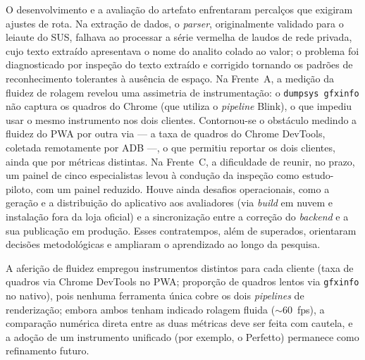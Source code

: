 O desenvolvimento e a avaliação do artefato enfrentaram percalços que exigiram
ajustes de rota. Na extração de dados, o \emph{parser}, originalmente validado para
o leiaute do SUS, falhava ao processar a série vermelha de laudos de rede privada,
cujo texto extraído apresentava o nome do analito colado ao valor; o problema foi
diagnosticado por inspeção do texto extraído e corrigido tornando os padrões de
reconhecimento tolerantes à ausência de espaço. Na Frente~A, a medição da fluidez
de rolagem revelou uma assimetria de instrumentação: o \texttt{dumpsys gfxinfo} não
captura os quadros do Chrome (que utiliza o \emph{pipeline} Blink), o que impediu
usar o mesmo instrumento nos dois clientes. Contornou-se o obstáculo medindo a
fluidez do PWA por outra via --- a taxa de quadros do Chrome DevTools, coletada
remotamente por ADB ---, o que permitiu reportar os dois clientes, ainda que por
métricas distintas. Na Frente~C, a dificuldade de
reunir, no prazo, um painel de cinco especialistas levou à condução da inspeção
como estudo-piloto, com um painel reduzido. Houve ainda desafios operacionais, como
a geração e a distribuição do aplicativo aos avaliadores (via \emph{build} em nuvem
e instalação fora da loja oficial) e a sincronização entre a correção do
\emph{backend} e a sua publicação em produção. Esses contratempos, além de
superados, orientaram decisões metodológicas e ampliaram o aprendizado ao longo da
pesquisa.

A aferição de fluidez empregou instrumentos distintos para cada cliente (taxa de
quadros via Chrome DevTools no PWA; proporção de quadros lentos via \texttt{gfxinfo}
no nativo), pois nenhuma ferramenta única cobre os dois \emph{pipelines} de
renderização; embora ambos tenham indicado rolagem fluida ($\sim$60~fps), a
comparação numérica direta entre as duas métricas deve ser feita com cautela, e a
adoção de um instrumento unificado (por exemplo, o Perfetto) permanece como
refinamento futuro.
